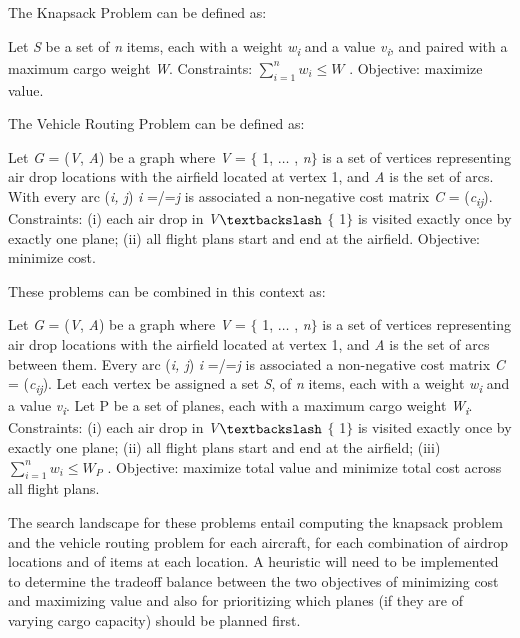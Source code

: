 \documentclass[journal]{IEEEtran}
\begin{document}
The Knapsack Problem can be defined as:\par

Let \textit{S} be a set of \textit{n} items, each with a weight \textit{w\textsubscript{i}} and a value \textit{v\textsubscript{i}}, and paired with a maximum cargo weight \textit{W}. Constraints:  \(  \sum _{i=1}^{n}w_{i}  \leq W \) . Objective: maximize value.\par

The Vehicle Routing Problem can be defined as:\par

Let \textit{G} = (\textit{V}, \textit{A}) be a graph where \textit{V} = $ \{ $ 1, $ \ldots $ , \textit{n}$ \} $  is a set of vertices representing air drop locations with the airfield located at vertex 1, and \textit{A} is the set of arcs. With every arc (\textit{i, j}) \textit{i} =/=\textit{j} is associated a non-negative cost matrix \textit{C} = (\textit{c\textsubscript{ij}}). Constraints: (i) each air drop in \textit{V}$\textbackslash$ $ \{ $ 1$ \} $  is visited exactly once by exactly one plane; (ii) all flight plans start and end at the airfield. Objective: minimize cost.\par

These problems can be combined in this context as:\par

Let \textit{G} = (\textit{V}, \textit{A}) be a graph where \textit{V} = $ \{ $ 1, $ \ldots $ , \textit{n}$ \} $  is a set of vertices representing air drop locations with the airfield located at vertex 1, and \textit{A} is the set of arcs between them. Every arc (\textit{i, j}) \textit{i} =/=\textit{j} is associated a non-negative cost matrix \textit{C} = (\textit{c\textsubscript{ij}}). Let each vertex be assigned a set \textit{S},\textit{ }of \textit{n} items, each with a weight \textit{w\textsubscript{i}} and a value \textit{v\textsubscript{i}}. Let P be a set of planes, each with a maximum cargo weight \textit{W\textsubscript{i}}. Constraints:  (i) each air drop in \textit{V}$\textbackslash$ $ \{ $ 1$ \} $  is visited exactly once by exactly one plane; (ii) all flight plans start and end at the airfield; (iii)  \(  \sum _{i=1}^{n}w_{i}  \leq W_{P} \) . Objective: maximize total value and minimize total cost across all flight plans.\par

\tab The search landscape for these problems entail computing the knapsack problem and the vehicle routing problem for each aircraft, for each combination of airdrop locations and of items at each location. A heuristic will need to be implemented to determine the tradeoff balance between the two objectives of minimizing cost and maximizing value and also for prioritizing which planes (if they are of varying cargo capacity) should be planned first.\par
\end{document}
